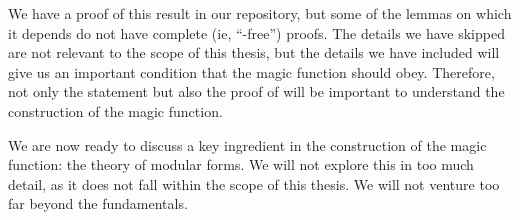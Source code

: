 We have a proof of this result in our repository, but some of the lemmas on which it depends do not have complete (ie, ``\sorry-free'') proofs. The details we have skipped are not relevant to the scope of this thesis, but the details we have included will give us an important condition that the magic function should obey. Therefore, not only the statement but also the proof of  will be important to understand the construction of the magic function.

We are now ready to discuss a key ingredient in the construction of the magic function: the theory of modular forms. We will not explore this in too much detail, as it does not fall within the scope of this thesis. We will not venture too far beyond the fundamentals.